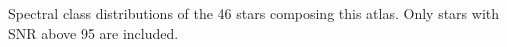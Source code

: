 Spectral class distributions of the 46 stars composing this atlas.  Only stars with SNR above 95 are included. 